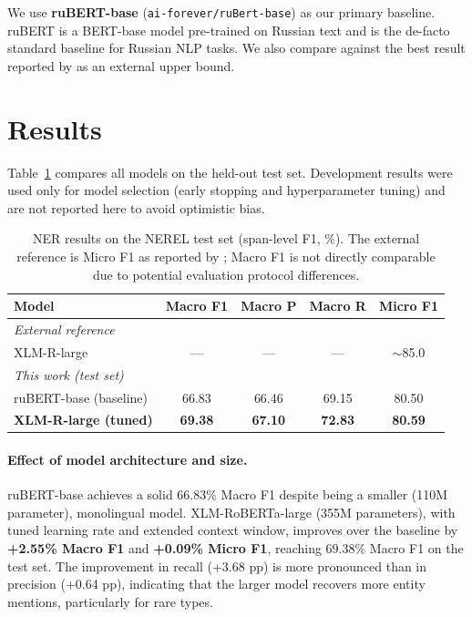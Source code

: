 \documentclass{article}
\begin{document}
We use \textbf{ruBERT-base} (\texttt{ai-forever/ruBert-base}) as our primary
baseline.
ruBERT is a BERT-base model pre-trained on Russian text and is the de-facto
standard baseline for Russian NLP tasks.
We also compare against the best result reported by
\citet{loukachevitch2021nerel} as an external upper bound.

\section{Results}

Table~\ref{tab:results} compares all models on the held-out test set.
Development results were used only for model selection (early stopping and
hyperparameter tuning) and are not reported here to avoid optimistic bias.

\begin{table}[tbh!]
\begin{center}
\begin{tabular}[t]{|l|cccc|}
\hline
Model & Macro F1 & Macro P & Macro R & Micro F1 \\
\hline
\multicolumn{5}{|l|}{\textit{External reference}} \\
\quad XLM-R-large~\cite{loukachevitch2021nerel} & --- & --- & --- & $\sim$85.0 \\
\hline
\multicolumn{5}{|l|}{\textit{This work (test set)}} \\
\quad ruBERT-base (baseline)        & 66.83 & 66.46 & 69.15 & 80.50 \\
\quad \textbf{XLM-R-large (tuned)} & \textbf{69.38} & \textbf{67.10} & \textbf{72.83} & \textbf{80.59} \\
\hline
\end{tabular}
\caption{NER results on the NEREL test set (span-level F1, \%).
         The external reference is Micro F1 as reported by
         \citet{loukachevitch2021nerel}; Macro F1 is not directly comparable
         due to potential evaluation protocol differences.}
\label{tab:results}
\end{center}
\end{table}

\paragraph{Effect of model architecture and size.}
ruBERT-base achieves a solid 66.83\% Macro F1 despite being a smaller
(110M parameter), monolingual model.
XLM-RoBERTa-large (355M parameters), with tuned learning rate and extended
context window, improves over the baseline by \textbf{+2.55\% Macro F1} and
\textbf{+0.09\% Micro F1}, reaching 69.38\% Macro F1 on the test set.
The improvement in recall (+3.68 pp) is more pronounced than in precision
(+0.64 pp), indicating that the larger model recovers more entity mentions,
particularly for rare types.
\end{document}
